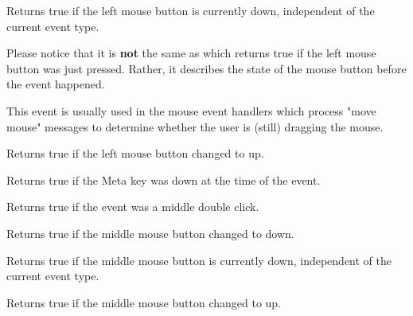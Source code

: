 
Returns true if the left mouse button is currently down, independent
of the current event type.

Please notice that it is {\bf not} the same as
 which returns true if the left mouse
button was just pressed. Rather, it describes the state of the mouse button
before the event happened.

This event is usually used in the mouse event handlers which process "move
mouse" messages to determine whether the user is (still) dragging the mouse.


\label{wxmouseeventleftup}


Returns true if the left mouse button changed to up.


\label{wxmouseeventmetadown}


Returns true if the Meta key was down at the time of the event.


\label{wxmouseeventmiddledclick}


Returns true if the event was a middle double click.


\label{wxmouseeventmiddledown}


Returns true if the middle mouse button changed to down.


\label{wxmouseeventmiddleisdown}


Returns true if the middle mouse button is currently down, independent
of the current event type.


\label{wxmouseeventmiddleup}


Returns true if the middle mouse button changed to up.


\label{wxmouseeventmoving}


